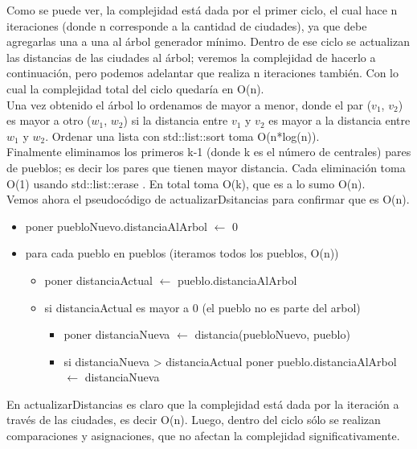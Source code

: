 Como se puede ver, la complejidad est\'a dada por el primer ciclo, el cual hace n iteraciones (donde n corresponde a la cantidad de ciudades), ya que debe agregarlas una a una al \'arbol generador m\'inimo. Dentro de ese ciclo se actualizan las distancias de las ciudades al \'arbol; veremos la complejidad de hacerlo a continuaci\'on, pero podemos adelantar que realiza n iteraciones tambi\'en. Con lo cual la complejidad total del ciclo quedar\'ia en O(n).\\
Una vez obtenido el \'arbol lo ordenamos de mayor a menor, donde el par ($v_1$, $v_2$) es mayor a otro ($w_1$, $w_2$) si la distancia entre $v_1$ y $v_2$ es mayor a la distancia entre $w_1$ y $w_2$. Ordenar una lista con std::list::sort toma O(n*log(n)). \cite{sort}\\
Finalmente eliminamos los primeros k-1 (donde k es el n\'umero de centrales) pares de pueblos; es decir los pares que tienen mayor distancia. Cada eliminaci\'on toma O(1) usando std::list::erase \cite{erase}. En total toma O(k), que es a lo sumo O(n).\\

Vemos ahora el pseudoc\'odigo de actualizarDsitancias para confirmar que es O(n).\\

\begin{itemize}
\item poner puebloNuevo.distanciaAlArbol $\leftarrow$ 0
\item para cada pueblo en pueblos (iteramos todos los pueblos, O(n))
\begin{itemize}
	\item poner distanciaActual $\leftarrow$ pueblo.distanciaAlArbol
	\item si distanciaActual es mayor a 0 (el pueblo no es parte del arbol)
	\begin{itemize}
		\item poner distanciaNueva $\leftarrow$ distancia(puebloNuevo, pueblo)
		\item si distanciaNueva > distanciaActual poner pueblo.distanciaAlArbol $\leftarrow$ distanciaNueva
	\end{itemize}
\end{itemize}
\end{itemize}

En actualizarDistancias es claro que la complejidad est\'a dada por la iteraci\'on a trav\'es de las ciudades, es decir O(n). Luego, dentro del ciclo s\'olo se realizan comparaciones y asignaciones, que no afectan la complejidad significativamente.\\


